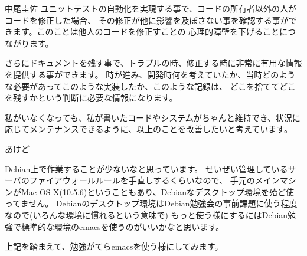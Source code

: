 \begin{prework}{中尾圭佐}
ユニットテストの自動化を実現する事で、コードの所有者以外の人がコードを修正した場合、
その修正が他に影響を及ぼさない事を確認する事ができます。このことは他人のコードを修正すことの
心理的障壁を下げることにつながります。

さらにドキュメントを残す事で、トラブルの時、修正する時に非常に有用な情報を提供する事ができます。
時が進み、開発時何を考えていたか、当時どのような必要があってこのような実装したか、このような記録は、
どこを捨ててどこを残すかという判断に必要な情報になります。

私がいなくなっても、私が書いたコードやシステムがちゃんと維持でき、状況に
応じてメンテナンスできるように、以上のことを改善したいと考えています。
\end{prework}

\begin{prework}{あけど}

Debian上で作業することが少ないなと思っています。
せいぜい管理しているサーバのファイアウォールルールを手直しするくらいなので、
手元のメインマシンがMac OS X(10.5.6)ということもあり、Debianなデスクトップ環境を殆ど使ってません。
Debianのデスクトップ環境はDebian勉強会の事前課題に使う程度なので(いろんな環境に慣れるという意味で)
もっと使う様にするにはDebian勉強で標準的な環境のemacsを使うのがいいかなと思います。


上記を踏まえて、勉強がてらemacsを使う様にしてみます。

\end{prework}

